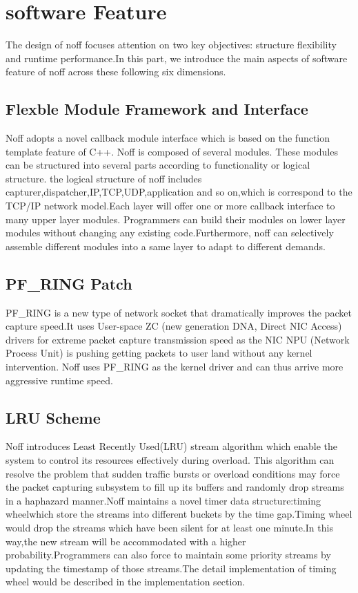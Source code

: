 \documentclass[conference]{IEEEtran}
\begin{document}
\section{software Feature}
The design of noff focuses attention on two key objectives: structure flexibility and runtime performance.In this part, we introduce the main aspects of software feature of noff across these following six dimensions.

\subsection{Flexble Module Framework and Interface}

Noff adopts a novel callback module interface which is based on the function template feature of C++. Noff is composed of several modules.
These modules can be structured into several parts according to functionality or logical structure. the logical structure of noff includes capturer,dispatcher,IP,TCP,UDP,application and so on,which is correspond to the TCP/IP network model.Each layer will offer one or more callback interface to many upper layer modules. Programmers can build their modules on lower layer modules without changing any existing code.Furthermore, noff can selectively assemble different modules into a same layer to adapt to different demands.

\subsection{PF\_RING Patch}
PF\_RING is a new type of network socket that dramatically improves the packet capture speed.It uses User-space ZC (new generation DNA, Direct NIC Access) drivers for extreme packet capture transmission speed as the NIC NPU (Network Process Unit) is pushing getting packets to user land without any kernel intervention. 
Noff uses PF\_RING as the kernel driver and can thus arrive more aggressive runtime speed.

\subsection{LRU Scheme}
Noff introduces Least Recently Used(LRU) stream algorithm which enable the system to control its resources effectively during overload. This algorithm can resolve the problem that sudden traffic bursts or overload conditions may force the packet capturing subsystem to fill up its buffers and randomly drop streams in a haphazard manner.Noff maintains a novel timer data structure:timing wheel\cite{IEEE:10}which store the streams into different buckets by the time gap.Timing wheel would drop the streams which have been silent for at least one minute.In this way,the new stream will be accommodated with a higher probability.Programmers can also force to maintain some priority streams by updating the timestamp of those streams.The detail implementation of timing wheel would be described in the implementation section.
\end{document}
